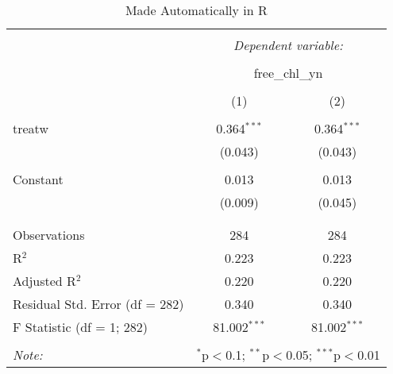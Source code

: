 
\begin{table}[!htbp] \centering 
  \caption{Made Automatically in R} 
  \label{} 
\begin{tabular}{@{\extracolsep{5pt}}lcc} 
\\[-1.8ex]\hline 
\hline \\[-1.8ex] 
 & \multicolumn{2}{c}{\textit{Dependent variable:}} \\ 
\cline{2-3} 
\\[-1.8ex] & \multicolumn{2}{c}{free\_chl\_yn} \\ 
\\[-1.8ex] & (1) & (2)\\ 
\hline \\[-1.8ex] 
 treatw & 0.364$^{***}$ & 0.364$^{***}$ \\ 
  & (0.043) & (0.043) \\ 
  & & \\ 
 Constant & 0.013 & 0.013 \\ 
  & (0.009) & (0.045) \\ 
  & & \\ 
\hline \\[-1.8ex] 
Observations & 284 & 284 \\ 
R$^{2}$ & 0.223 & 0.223 \\ 
Adjusted R$^{2}$ & 0.220 & 0.220 \\ 
Residual Std. Error (df = 282) & 0.340 & 0.340 \\ 
F Statistic (df = 1; 282) & 81.002$^{***}$ & 81.002$^{***}$ \\ 
\hline 
\hline \\[-1.8ex] 
\textit{Note:}  & \multicolumn{2}{r}{$^{*}$p$<$0.1; $^{**}$p$<$0.05; $^{***}$p$<$0.01} \\ 
\end{tabular} 
\end{table} 
